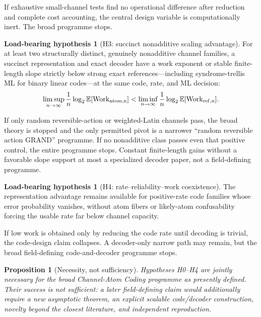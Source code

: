 \documentclass[11pt]{article}
\newtheorem{proposition}[theorem]{Proposition}
\theoremstyle{definition}
\newtheorem{hypothesis}[theorem]{Load-bearing hypothesis}
\theoremstyle{remark}
\newcommand{\E}{\mathbb E}
\newcommand{\Work}{\operatorname{Work}}
\begin{document}
\begin{stopbox}
If exhaustive small-channel tests find no operational difference after reduction and complete cost accounting, the central design variable is computationally inert. The broad programme stops.
\end{stopbox}

\begin{hypothesis}[H3: succinct nonadditive scaling advantage]
For at least two structurally distinct, genuinely nonadditive channel families, a succinct representation and exact decoder have a work exponent or stable finite-length slope strictly below strong exact references---including syndrome-trellis ML for binary linear codes---at the same code, rate, and ML decision:
\begin{equation}
 \limsup_{n\to\infty}\frac1n\log_2\E[\Work_{\rm atom,n}]
 <
 \liminf_{n\to\infty}\frac1n\log_2\E[\Work_{\rm ref,n}].
 \label{eq:scalinghyp}
\end{equation}
\label{hyp:H3}
\end{hypothesis}

\begin{pivotbox}
If only random reversible-action or weighted-Latin channels pass, the broad theory is stopped and the only permitted pivot is a narrower ``random reversible action GRAND'' programme. If no nonadditive class passes even that positive control, the entire programme stops. Constant finite-length gains without a favorable slope support at most a specialized decoder paper, not a field-defining programme.
\end{pivotbox}

\begin{hypothesis}[H4: rate--reliability--work coexistence]
The representation advantage remains available for positive-rate code families whose error probability vanishes, without atom fibers or likely-atom confusability forcing the usable rate far below channel capacity.
\label{hyp:H4}
\end{hypothesis}

\begin{pivotbox}
If low work is obtained only by reducing the code rate until decoding is trivial, the code-design claim collapses. A decoder-only narrow path may remain, but the broad field-defining code-and-decoder programme stops.
\end{pivotbox}

\begin{proposition}[Necessity, not sufficiency]
Hypotheses H0--H4 are jointly necessary for the broad Channel-Atom Coding programme as presently defined. Their success is not sufficient: a later field-defining claim would additionally require a new asymptotic theorem, an explicit scalable code/decoder construction, novelty beyond the closest literature, and independent reproduction.
\end{proposition}
\end{document}
